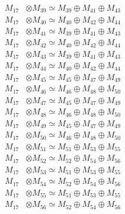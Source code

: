 \begin{align*}
M_{17} &\otimes M_{39} \simeq M_{39} \oplus M_{41} \oplus M_{43} \\
M_{17} &\otimes M_{40} \simeq M_{40} \oplus M_{42} \oplus M_{44} \\
M_{17} &\otimes M_{41} \simeq M_{39} \oplus M_{41} \oplus M_{43} \\
M_{17} &\otimes M_{42} \simeq M_{40} \oplus M_{42} \oplus M_{44} \\
M_{17} &\otimes M_{43} \simeq M_{39} \oplus M_{41} \oplus M_{43} \\
M_{17} &\otimes M_{44} \simeq M_{40} \oplus M_{42} \oplus M_{44} \\
M_{17} &\otimes M_{45} \simeq M_{45} \oplus M_{47} \oplus M_{49} \\
M_{17} &\otimes M_{46} \simeq M_{46} \oplus M_{48} \oplus M_{50} \\
M_{17} &\otimes M_{47} \simeq M_{45} \oplus M_{47} \oplus M_{49} \\
M_{17} &\otimes M_{48} \simeq M_{46} \oplus M_{48} \oplus M_{50} \\
M_{17} &\otimes M_{49} \simeq M_{45} \oplus M_{47} \oplus M_{49} \\
M_{17} &\otimes M_{50} \simeq M_{46} \oplus M_{48} \oplus M_{50} \\
M_{17} &\otimes M_{51} \simeq M_{51} \oplus M_{53} \oplus M_{55} \\
M_{17} &\otimes M_{52} \simeq M_{52} \oplus M_{54} \oplus M_{56} \\
M_{17} &\otimes M_{53} \simeq M_{51} \oplus M_{53} \oplus M_{55} \\
M_{17} &\otimes M_{54} \simeq M_{52} \oplus M_{54} \oplus M_{56} \\
M_{17} &\otimes M_{55} \simeq M_{51} \oplus M_{53} \oplus M_{55} \\
M_{17} &\otimes M_{56} \simeq M_{52} \oplus M_{54} \oplus M_{56} \\
\end{align*}

